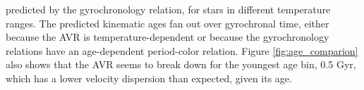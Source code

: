 predicted by the \citet{angus2019} gyrochronology relation, for stars in
different temperature ranges.
The predicted kinematic ages fan out over gyrochronal time, either because the
AVR is temperature-dependent or because the gyrochronology relations have an
age-dependent period-color relation.
Figure \ref{fig:age_comparion} also shows that the AVR seems to break down for
the youngest age bin, 0.5 Gyr, which has a lower velocity dispersion than
expected, given its age.


